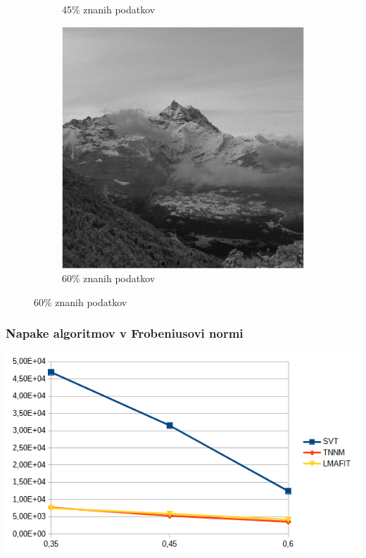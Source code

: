 \documentclass{beamer}
\begin{document}
\begin{frame}
\begin{figure}
\begin{subfigure}{0.325\linewidth}
      \caption{45\% znanih podatkov}
    \end{subfigure}
    \begin{subfigure}{0.325\linewidth}
      \includegraphics[width=\linewidth]{slike/gora/slikaRez60LmaFIT77.png}
      \caption{60\% znanih podatkov}
    \end{subfigure}
  \end{figure}
\end{frame}


\begin{frame}
  \frametitle{Napake algoritmov v Frobeniusovi normi}
  \includegraphics[width=\linewidth]{slike/gora/grafNapake.png}
\end{frame}
\end{document}
